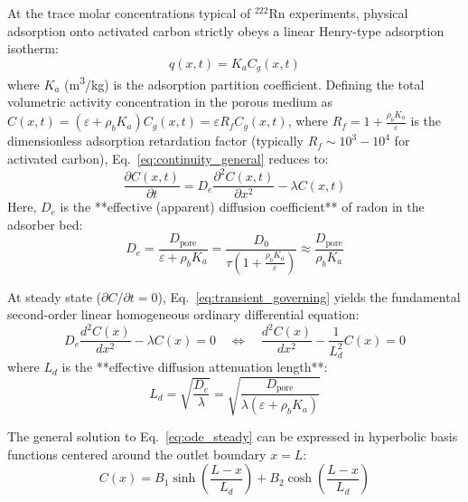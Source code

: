 \documentclass[11pt,a4paper]{article}
\begin{document}
At the trace molar concentrations typical of $^{222}\text{Rn}$ experiments, physical adsorption onto activated carbon strictly obeys a linear Henry-type adsorption isotherm:
\begin{equation}
    q(x,t) = K_a C_g(x,t)
    \label{eq:henry}
\end{equation}
where $K_a$ (\si{m^3/kg}) is the adsorption partition coefficient. Defining the total volumetric activity concentration in the porous medium as $C(x,t) = (\varepsilon + \rho_b K_a) C_g(x,t) = \varepsilon R_f C_g(x,t)$, where $R_f = 1 + \frac{\rho_b K_a}{\varepsilon}$ is the dimensionless adsorption retardation factor (typically $R_f \sim 10^3 - 10^4$ for activated carbon), Eq.~\eqref{eq:continuity_general} reduces to:
\begin{equation}
    \frac{\partial C(x,t)}{\partial t} = D_e \frac{\partial^2 C(x,t)}{\partial x^2} - \lambda C(x,t)
    \label{eq:transient_governing}
\end{equation}
Here, $D_e$ is the **effective (apparent) diffusion coefficient** of radon in the adsorber bed:
\begin{equation}
    D_e = \frac{D_{\text{pore}}}{\varepsilon + \rho_b K_a} = \frac{D_0}{\tau \left(1 + \frac{\rho_b K_a}{\varepsilon}\right)} \approx \frac{D_{\text{pore}}}{\rho_b K_a}
    \label{eq:De_definition}
\end{equation}

At steady state ($\partial C / \partial t = 0$), Eq.~\eqref{eq:transient_governing} yields the fundamental second-order linear homogeneous ordinary differential equation:
\begin{equation}
    D_e \frac{d^2 C(x)}{dx^2} - \lambda C(x) = 0 \quad \Longleftrightarrow \quad \frac{d^2 C(x)}{dx^2} - \frac{1}{L_d^2} C(x) = 0
    \label{eq:ode_steady}
\end{equation}
where $L_d$ is the **effective diffusion attenuation length**:
\begin{equation}
    L_d = \sqrt{\frac{D_e}{\lambda}} = \sqrt{\frac{D_{\text{pore}}}{\lambda(\varepsilon + \rho_b K_a)}}
    \label{eq:Ld_definition}
\end{equation}

The general solution to Eq.~\eqref{eq:ode_steady} can be expressed in hyperbolic basis functions centered around the outlet boundary $x = L$:
\begin{equation}
    C(x) = B_1 \sinh\left(\frac{L - x}{L_d}\right) + B_2 \cosh\left(\frac{L - x}{L_d}\right)
    \label{eq:general_solution}
\end{equation}
\end{document}
